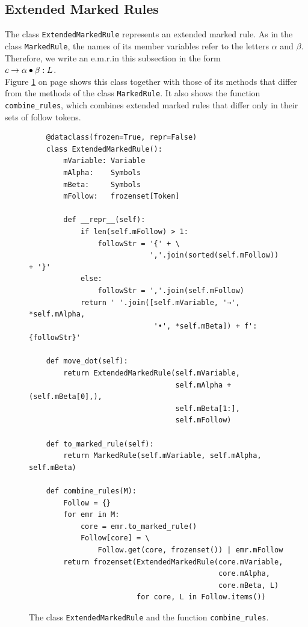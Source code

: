 \subsection{Extended Marked Rules}
The class \texttt{ExtendedMarkedRule} represents an extended marked rule.  As in the class \texttt{MarkedRule}, the
names of its member variables refer to the letters $\alpha$ and $\beta$.  Therefore, we write an e.m.r.\@ in this
subsection in the form
\\[0.2cm]
\hspace*{1.3cm}
$c \rightarrow \alpha \mdot \beta: L$.
\\[0.2cm]
Figure \ref{fig:05-LR-Table-Generator.ipynb:ExtendedMarkedRule} on page
\pageref{fig:05-LR-Table-Generator.ipynb:ExtendedMarkedRule} shows this class together with those of its methods that
differ from the methods of the class \texttt{MarkedRule}.  It also shows the function \texttt{combine\_rules}, which
combines extended marked rules that differ only in their sets of follow tokens.

\begin{figure}[!ht]
\centering
\begin{verbatim}
    @dataclass(frozen=True, repr=False)
    class ExtendedMarkedRule():
        mVariable: Variable
        mAlpha:    Symbols
        mBeta:     Symbols
        mFollow:   frozenset[Token]

        def __repr__(self):
            if len(self.mFollow) > 1:
                followStr = '{' + \
                            ','.join(sorted(self.mFollow)) + '}'
            else:
                followStr = ','.join(self.mFollow)
            return ' '.join([self.mVariable, '→', *self.mAlpha,
                             '•', *self.mBeta]) + f': {followStr}'

    def move_dot(self):
        return ExtendedMarkedRule(self.mVariable,
                                  self.mAlpha + (self.mBeta[0],),
                                  self.mBeta[1:],
                                  self.mFollow)

    def to_marked_rule(self):
        return MarkedRule(self.mVariable, self.mAlpha, self.mBeta)

    def combine_rules(M):
        Follow = {}
        for emr in M:
            core = emr.to_marked_rule()
            Follow[core] = \
                Follow.get(core, frozenset()) | emr.mFollow
        return frozenset(ExtendedMarkedRule(core.mVariable,
                                            core.mAlpha,
                                            core.mBeta, L)
                         for core, L in Follow.items())
\end{verbatim}
\vspace*{-0.3cm}
\caption{The class \texttt{ExtendedMarkedRule} and the function \texttt{combine\_rules}.}
\label{fig:05-LR-Table-Generator.ipynb:ExtendedMarkedRule}
\end{figure}

